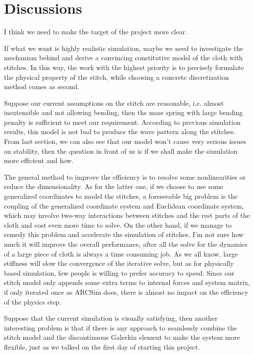 \documentclass[a4paper,10pt]{article}
\begin{document}
\section{Discussions}

I think we need to make the target of the project more clear. 

If what we want is highly realistic simulation, maybe we need to investigate the mechanism behind and derive a convincing constitutive model of the cloth with stitches. 
In this way, the work with the highest priority is to precisely formulate the physical property of the stitch, while choosing a concrete discretization method comes as second.

Suppose our current assumptions on the stitch are reasonable, i.e. almost inextensible and not allowing bending, then the mass spring with large bending penalty is 
sufficient to meet our requirement. According to previous simulation results, this model is not bad to produce the wave pattern along the stitches.
From last section, we can also see that our model won't cause very serious issues on stability, then the question in front of us is if we shall make the simulation more efficient and how.  

The general method to improve the efficiency is to resolve some nonlinearities or reduce the dimensionality. As for the latter one, if we choose to use some generalized coordinates to model the stitches, 
a foreseeable big problem is the coupling of the generalized coordinate system and Euclidean coordinate system, which may involve two-way interactions between stitches and the rest parts of
the cloth and cost even more time to solve. On the other hand, if we manage to remedy this problem and accelerate the simulation of stitches, I'm not sure how much it will improve the overall performance, after all the solve for the dynamics of a large piece of cloth
is always a time consuming job. As we all know, large stiffness will slow the convergence of the iterative solve, but as for physically based simulation, few people is willing to prefer accuracy to speed. 
Since our stitch model only appends some extra terms to internal forces and system matrix, if only iterated once as ARCSim does, there is almost no impact on the efficiency of the physics step.

Suppose that the current simulation is visually satisfying, then another interesting problem is that if there is any approach to seamlessly combine the stitch model and the discontinuous Galerkin element to make the system
more flexible, just as we talked on the first day of starting this project.
\end{document}
